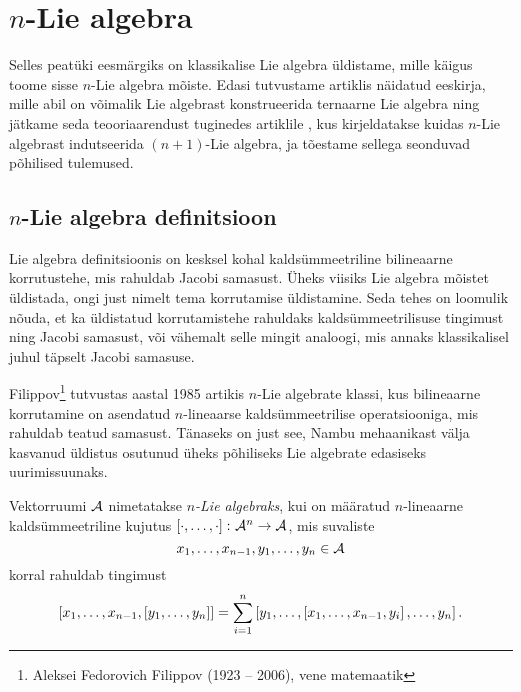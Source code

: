 

\section{\texorpdfstring{$n$}\ -Lie algebra}

Selles peatüki eesmärgiks on klassikalise Lie algebra
üldistame, mille käigus toome sisse $n$-Lie algebra mõiste.
Edasi tutvustame artiklis \cite{AMS:2011} näidatud eeskirja,
mille abil on võimalik Lie algebrast konstrueerida
ternaarne Lie algebra ning jätkame seda teooriaarendust
tuginedes artiklile \cite{AKMS:2014}, kus kirjeldatakse
kuidas $n$-Lie algebrast indutseerida $(n+1)$-Lie algebra, ja
tõestame sellega seonduvad põhilised tulemused.

\subsection{\texorpdfstring{$n$}\ -Lie algebra definitsioon}

Lie algebra definitsioonis on kesksel kohal kaldsümmeetriline
bilineaarne korrutustehe, mis rahuldab Jacobi samasust.
Üheks viisiks Lie algebra mõistet üldistada, ongi just nimelt
tema korrutamise üldistamine. Seda tehes on loomulik nõuda, et
ka üldistatud korrutamistehe rahuldaks kaldsümmeetrilisuse
tingimust ning Jacobi samasust, või vähemalt selle mingit
analoogi, mis annaks klassikalisel juhul täpselt
Jacobi samasuse.

Filippov\footnote{Aleksei Fedorovich Filippov (1923 -- 2006),
vene matemaatik} tutvustas aastal 1985 artikis \cite{filippov1985}
$n$-Lie algebrate klassi, kus bilineaarne korrutamine on
asendatud $n$-lineaarse kaldsümmeetrilise operatsiooniga,
mis rahuldab teatud samasust.\cite{kasymov1987}
Tänaseks on just see, Nambu mehaanikast välja kasvanud
üldistus osutunud üheks põhiliseks Lie algebrate edasiseks
uurimissuunaks.

\begin{dfn}
    Vektorruumi $\mathcal{A}$ nimetatakse \emph{$n$-Lie algebraks}, kui
    on määratud $n$-lineaarne kaldsümmeetriline kujutus
    $\left[ \cdot, \dots, \cdot \right] \colon \mathcal{A}^n \to \mathcal{A}$, mis
    suvaliste
    \[ x_1, \dots, x_{n-1}, y_1, \dots, y_n \in \mathcal{A} \]
    korral rahuldab tingimust
    \begin{align}\label{id:filippov}
        \left[ x_1, \dots, x_{n-1}, \left[ y_1, \dots, y_n \right] \right] =
        \sum_{i=1}^n \left[
            y_1, \dots, \left[ x_1, \dots, x_{n-1}, y_i \right], \dots, y_n
        \right].
    \end{align}
\end{dfn}

